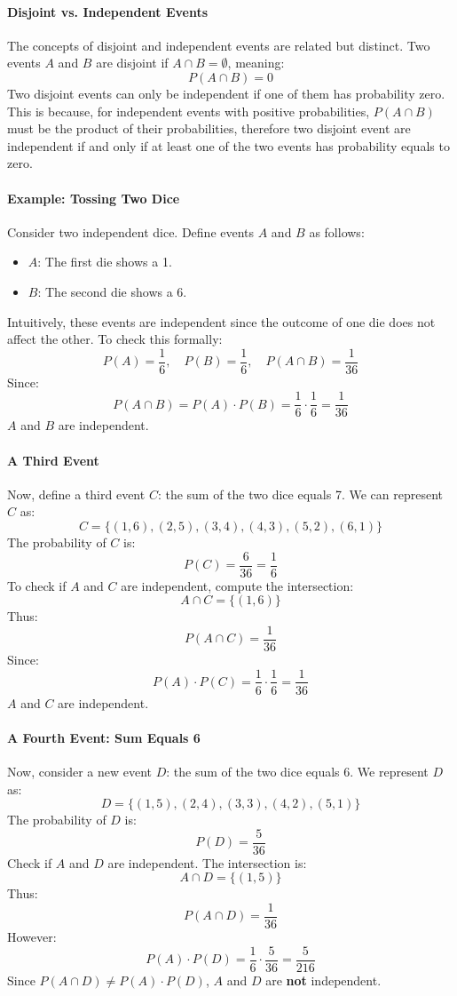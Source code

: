     \paragraph{Disjoint vs. Independent Events}
    The concepts of disjoint and independent events are related but distinct. Two events $A$ and $B$ are disjoint if $A \cap B = \emptyset$, meaning:
    \[
    {P}(A \cap B) = 0
    \]
    Two disjoint events can only be independent if one of them has probability zero. This is because, for independent events with positive probabilities, ${P}(A \cap B)$ must be the product of their probabilities, therefore two disjoint event are independent if and only if at least one of the two events has probability equals to zero.
    
    \paragraph{Example: Tossing Two Dice}
    Consider two independent dice. Define events $A$ and $B$ as follows:
    \begin{itemize}
        \item $A$: The first die shows a 1.
        \item $B$: The second die shows a 6.
    \end{itemize}
    Intuitively, these events are independent since the outcome of one die does not affect the other. \newline
    To check this formally:
    \[
    {P}(A) = \frac{1}{6}, \quad {P}(B) = \frac{1}{6}, \quad {P}(A \cap B) = \frac{1}{36}
    \]
    Since:
    \[
    {P}(A \cap B) = {P}(A) \cdot {P}(B) = \frac{1}{6} \cdot \frac{1}{6} = \frac{1}{36}
    \]
    $A$ and $B$ are independent.
    \paragraph{A Third Event}
    Now, define a third event $C$: the sum of the two dice equals 7. We can represent $C$ as:
    \[
    C = \{(1,6), (2,5), (3,4), (4,3), (5,2), (6,1)\}
    \]
    The probability of $C$ is:
    \[
    {P}(C) = \frac{6}{36} = \frac{1}{6}
    \]
    To check if $A$ and $C$ are independent, compute the intersection:
    \[
    A \cap C = \{(1,6)\}
    \]
    Thus:
    \[
    {P}(A \cap C) = \frac{1}{36}
    \]
    Since:
    \[
    {P}(A) \cdot {P}(C) = \frac{1}{6} \cdot \frac{1}{6} = \frac{1}{36}
    \]
    $A$ and $C$ are independent.
    
    \paragraph{A Fourth Event: Sum Equals 6}
    Now, consider a new event $D$: the sum of the two dice equals 6. We represent $D$ as:
    \[
    D = \{(1,5), (2,4), (3,3), (4,2), (5,1)\}
    \]
    The probability of $D$ is:
    \[
    {P}(D) = \frac{5}{36}
    \]
    Check if $A$ and $D$ are independent. The intersection is:
    \[
    A \cap D = \{(1,5)\}
    \]
    Thus:
    \[
    {P}(A \cap D) = \frac{1}{36}
    \]
    However:
    \[
    {P}(A) \cdot {P}(D) = \frac{1}{6} \cdot \frac{5}{36} = \frac{5}{216}
    \]
    Since ${P}(A \cap D) \neq {P}(A) \cdot {P}(D)$, $A$ and $D$ are \textbf{not} independent.
    
